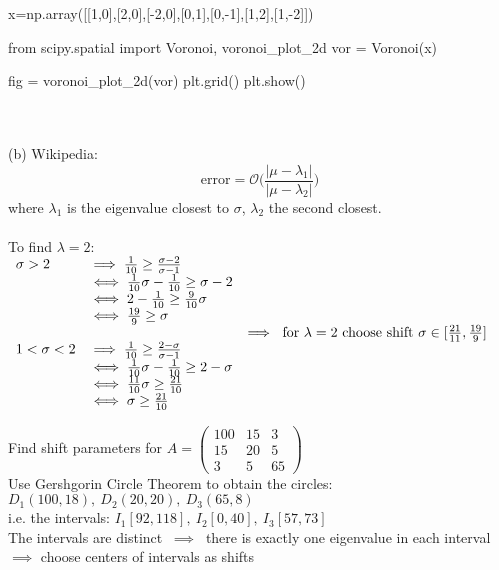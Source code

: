 \begin{SolutionSheet}[\ref{sheet3}]
\begin{onehalfspace}
\begin{Solution}
\begin{pycode}
      x=np.array([[1,0],[2,0],[-2,0],[0,1],[0,-1],[1,2],[1,-2]])

      from scipy.spatial import Voronoi, voronoi_plot_2d
      vor = Voronoi(x)

      fig = voronoi_plot_2d(vor)
      plt.grid()
      plt.show()
    \end{pycode}
    \\
    \\
    (b) Wikipedia: \begin{equation*}
      \text{error} = \mathcal{O}\big(\frac{|\mu -\lambda_1|}{|\mu -\lambda_2|}\big) 
    \end{equation*}
    where $\lambda_1$ is the eigenvalue closest to $\sigma$, $\lambda_2$ the second closest.\\
    \\
    To find $\lambda = 2$:\\
    $\begin{array}{ll}
      \sigma > 2 &\implies \frac{1}{10} \geq \frac{\sigma - 2}{\sigma - 1}\\
        &\iff \frac{1}{10}\sigma - \frac{1}{10} \geq \sigma - 2 \\
        &\iff 2-\frac{1}{10} \geq \frac{9}{10}\sigma \\
        &\iff \frac{19}{9} \geq \sigma \\
        \\
      1 < \sigma < 2 &\implies \frac{1}{10} \geq \frac{2-\sigma}{\sigma -1} \\
       &\iff \frac{1}{10}\sigma - \frac{1}{10} \geq 2-\sigma \\
       &\iff \frac{11}{10}\sigma \geq \frac{21}{10} \\
       &\iff \sigma \geq \frac{21}{10}
    \end{array}\\
    \implies \text{ for }  \lambda=2  \text{ choose shift } \sigma\in  [\frac{21}{11}, \frac{19}{9}] $
  \end{Solution}

  \begin{Solution} Find shift parameters for $A= \begin{pmatrix}
    100 & 15 & 3 \\
    15 & 20 & 5 \\
    3 & 5 & 65
  \end{pmatrix}$\\
  Use Gershgorin Circle Theorem to obtain the circles: \\
  $D_1(100,18), \ D_2(20,20), \ D_3(65,8) \quad$ \\
  i.e. the intervals: $I_1[92,118], \ I_2[0,40], \ I_3[57,73]$\\
  The intervals are distinct $ \ \implies \ $ there is exactly one eigenvalue in each interval \\
  $\implies$ choose centers of intervals as shifts 
  \end{Solution}


\end{onehalfspace}
\end{SolutionSheet}
